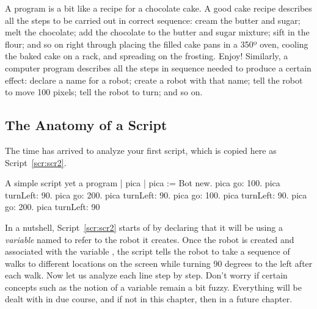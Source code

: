 \documentclass[a4paper,10pt,twoside]{book}
\begin{document}


A program is a bit like a recipe for a chocolate cake. A good cake recipe describes all the 
steps to be carried out in correct sequence: cream the butter and sugar; melt the chocolate; 
add the chocolate to the butter and sugar mixture; sift in the flour; and so on right through 
placing the filled cake pans in a 350º oven, cooling the baked cake on a rack, and spreading on the frosting. Enjoy! Similarly, a computer program describes all the steps in sequence needed to produce a certain effect: declare a name for a robot; create a robot with that name; tell the robot to move 100 pixels; tell the robot to turn; and so on. 

\subsection{The Anatomy of a Script}
The time has arrived to analyze your first script, which is copied here as Script~\ref{scr:scr2}. 


\begin{script}[scr2]{A simple script yet a program}
	| pica | 
	pica := Bot new. 
	pica go: 100. 
	pica turnLeft: 90. 
	pica go: 200. 
	pica turnLeft: 90. 
	pica go: 100. 
	pica turnLeft: 90. 
	pica go: 200. 
	pica turnLeft: 90 
\end{script}


In a nutshell, Script~\ref{scr:scr2} starts of by declaring that it will be using a \emph{variable} named  to refer to the robot it creates. Once the robot is created and associated with the variable , the script tells the robot to take a sequence of walks to different locations on the screen while turning 90 degrees to the left after each walk. Now let us analyze each line step by step. Don't  worry if certain concepts such as the notion of a variable remain a bit fuzzy. Everything will be dealt with in due course, and if not in this chapter, then in a future chapter. 
\end{document}

